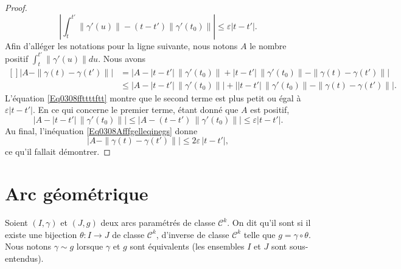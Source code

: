 \begin{proof}
	\begin{equation}
		\left| \int_t^{t'}\big\| \gamma'(u) \big\|-(t-t')\big\| \gamma'(t_0) \big\| \right| \leq\varepsilon| t-t' |.
	\end{equation}
	Afin d'alléger les notations pour la ligne suivante, nous notons \( A\) le nombre positif \( \int_t^{t'}\| \gamma'(u) \|du\). Nous avons
	\begin{equation}        \label{Eq0308Afffgelleqinegs}
		\begin{aligned}[]
			\Big| A-\| \gamma(t)-\gamma(t')\| \Big| & =\Big| A-| t-t' |\,\| \gamma'(t_0) \|+| t-t' |\,\| \gamma'(t_0) \|-\| \gamma(t)-\gamma(t') \| \Big|                      \\
			                                        & \leq\Big|  A-| t-t' |\,\| \gamma'(t_0) \|  \Big|+\Big| | t-t' |\,\| \gamma'(t_0) \|-\| \gamma(t)-\gamma(t') \|    \Big|.
		\end{aligned}
	\end{equation}
	L'équation \eqref{Eq0308ffttttftt} montre que le second terme est plus petit ou égal à \( \varepsilon| t-t' |\). En ce qui concerne le premier terme, étant donné que \( A\) est positif,
	\begin{equation}
		\Big|   A-| t-t' |\,\| \gamma'(t_0) \|   \Big| \leq\Big|  A-(t-t')\,\| \gamma'(t_0) \|  \Big|\leq \varepsilon| t-t' |.
	\end{equation}
	Au final, l'inéquation \eqref{Eq0308Afffgelleqinegs} donne
	\begin{equation}
		\Big| A-\| \gamma(t)-\gamma(t')\| \Big| \leq 2\varepsilon\,| t-t' |,
	\end{equation}
	ce qu'il fallait démontrer.
\end{proof}

\section{Arc géométrique}
\label{SecArcGeometrique}

\begin{definition}      \label{DefAcrEquiva}
	Soient \( (I,\gamma)\) et \( (J,g)\) deux arcs paramétrés de classe \( \mathcal{C}^k\). On dit qu'il sont  si il existe une bijection \( \theta\colon I\to J\) de classe \( \mathcal{C}^k\), d'inverse de classe \( \mathcal{C}^k\) telle que \( g=\gamma\circ\theta\). Nous notons \( \gamma\sim g\) lorsque \( \gamma\) et \( g\) sont équivalents (les ensembles \( I\) et \( J\) sont sous-entendus).
\end{definition}

